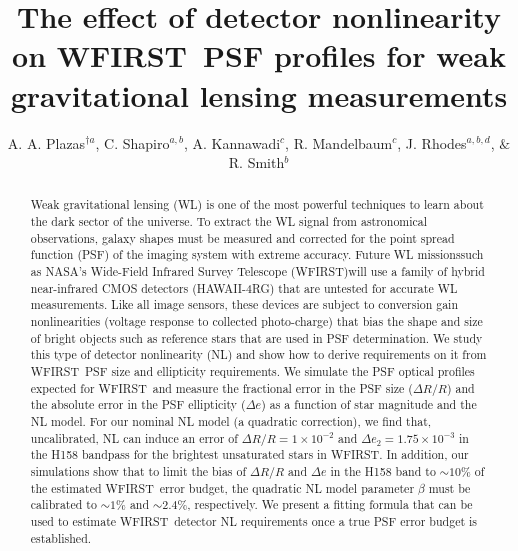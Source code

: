 \documentclass[preprint]{aastex}
\begin{document}
\newcommand {\gs} {{\tt{GalSim}}}  
\newcommand {\wf} {WFIRST}  
\newcommand {\wfa} {WFIRST}  
\newcommand {\optical} {{\tt{OpticalPSF}}} 
\newcommand {\gauss} {{\tt{Gaussian}}} 


\title{The effect of detector nonlinearity on \wfa\ PSF profiles for weak gravitational lensing measurements}
\author{A. A. Plazas$^{\dagger a}$, C. Shapiro$^{a,b}$, A. Kannawadi$^c$, R. Mandelbaum$^c$, J. Rhodes$^{a,b,d}$, $\&$ R. Smith$^b$  }

\begin{abstract}
Weak gravitational lensing (WL) is one of the most powerful techniques to learn about the dark sector of the universe. To extract the WL signal from astronomical observations, galaxy shapes must be measured and corrected for the point spread function (PSF) of the imaging system with extreme accuracy. Future WL missions\textemdash such as NASA's Wide-Field Infrared Survey Telescope (WFIRST)\textemdash will use a family of hybrid near-infrared CMOS detectors (HAWAII-4RG) that are untested for accurate WL measurements.  Like all image sensors, these devices are subject to conversion gain nonlinearities (voltage response to collected photo-charge) that bias the shape and size of bright objects such as reference stars that are used in PSF determination.
We study this type of detector nonlinearity (NL) and show how to derive requirements on it from \wf\ PSF size and ellipticity requirements. We simulate the PSF optical profiles expected for \wf\, and measure the fractional error in the PSF size ($\Delta R/R$) and the absolute error in the PSF ellipticity ($\Delta e$) as a function of star magnitude and the NL model. For our nominal NL model (a quadratic correction), we find that, uncalibrated, NL can induce an error of $\Delta R/R=1\times10^{-2}$ and $\Delta e_2=1.75\times 10^{-3}$ in the H158 bandpass for the brightest unsaturated stars in \wf. In addition, our simulations show that to limit the bias of $\Delta R/R$ and $\Delta e$ in the H158 band to $\sim 10\%$ of the estimated \wf\ error budget, the quadratic NL model parameter $\beta$ must be calibrated to $\sim1\%$ and $\sim 2.4\%$, respectively. We present a fitting formula that can be used to estimate \wf\ detector NL requirements once a true PSF error budget is established.
\end{abstract}
\end{document}
